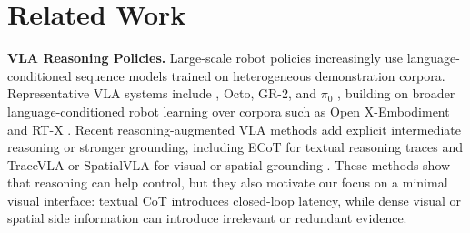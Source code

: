\section{Related Work}

\noindent\textbf{VLA Reasoning Policies.}
Large-scale robot policies increasingly use language-conditioned sequence models trained on heterogeneous demonstration corpora. Representative VLA systems include \openvla{}, Octo, GR-2, and $\pi_0$ \citep{kim24openvla,octo2024,cheang2024gr2,black2024pi0}, building on broader language-conditioned robot learning over corpora such as Open X-Embodiment and RT-X \citep{openx2023,ahn2022saycan,driess2023palm,brohan2023rt2}. Recent reasoning-augmented VLA methods add explicit intermediate reasoning or stronger grounding, including ECoT for textual reasoning traces and TraceVLA or SpatialVLA for visual or spatial grounding \citep{zawalski2024ecot,zheng2024tracevla,qu2025spatialvla}. These methods show that reasoning can help control, but they also motivate our focus on a minimal visual interface: textual CoT introduces closed-loop latency, while dense visual or spatial side information can introduce irrelevant or redundant evidence.

\begin{table}[H]
\centering
\small
\setlength{\tabcolsep}{7pt}
\renewcommand{\arraystretch}{1.08}
\caption{Explicit visual cues used by representative VLA methods.Depth and segmentation are included in the initial candidate bank but screened out from the default operational setting.}
\label{tab:visual_cue_compare}
\end{table}

